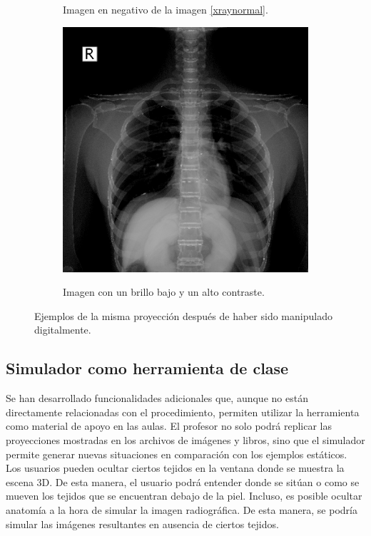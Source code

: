 \begin{figure}[h]
\begin{subfigure}[b]{0.3\linewidth}
        \caption{Imagen en negativo de la imagen \ref{xraynormal}.}
    \end{subfigure}
    \null\hfill
     \begin{subfigure}[b]{0.3\linewidth}
        \centering
        {\includegraphics[width=\linewidth]{IMG/XRayMaleFilter2.png}}
        \caption{Imagen con un brillo bajo y un alto contraste.}
    \end{subfigure}
    \caption{\label{fig:imgmani}  Ejemplos de la misma proyección después de haber sido manipulado digitalmente.}
   \end{figure}



\subsection{Simulador como herramienta de clase}
\label{xray:sim}

Se han desarrollado funcionalidades adicionales que, aunque no están directamente relacionadas con el procedimiento, permiten utilizar la herramienta como material de apoyo en las aulas. El profesor no solo podrá replicar las proyecciones mostradas en los archivos de imágenes y libros, sino que el simulador permite generar nuevas situaciones en comparación con los ejemplos estáticos.  %
Los usuarios pueden ocultar ciertos tejidos en la ventana donde se muestra la escena 3D. De esta manera, el usuario podrá entender donde se sitúan o como se mueven los tejidos que se encuentran debajo de la piel. Incluso, es posible ocultar anatomía a la hora de simular la imagen radiográfica. De esta manera, se podría simular las imágenes resultantes en ausencia de ciertos tejidos. 

